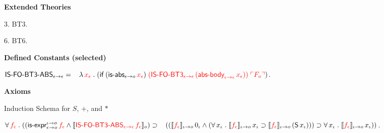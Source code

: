 \begin{biformthy}
    \ee

\ei
\end{biformthy}

\begin{biformthy}\em

\bi

  \item[]

  \item[] \textbf{Extended Theories} 

  \be

    \item[3.] BT3.

    \item[6.] BT6.

  \ee

  \item[] \textbf{Defined Constants (selected)}

  \be

    \setcounter{enumi}{7}

    \item $\mbox{\sf IS-FO-BT3-ABS}_{\epsilon \rightarrow \epsilon} = {}\\
    \hspace*{2ex}\lambda\, \textcolor{red}{x_\epsilon} \mathrel. 
    (\mbox{\sf if} \; (\mbox{\sf is-abs}_{\epsilon \rightarrow o} \, \textcolor{red}{x_\epsilon}) \;
    \textcolor{red}{(\mbox{\sf IS-FO-BT3}_{\epsilon \rightarrow \epsilon} \,
    (\mbox{\sf abs-body}_{\epsilon \rightarrow \epsilon} \, x_\epsilon))} \;
    \textcolor{red}{\ulcorner F_o\urcorner})$.

  \ee

  \item[] \textbf{Axioms}

  \be

    \setcounter{enumi}{30}

    \item Induction Schema for $S$, $+$, and $*$

    $\forall\, \textcolor{red}{f_\epsilon} \mathrel. 
    ((\mbox{\sf is-expr}_{\epsilon \rightarrow o}^{\iota \rightarrow o} \, \textcolor{red}{f_\epsilon} \wedge
    \llbracket\textcolor{red}{\mbox{\sf IS-FO-BT3-ABS}_{\epsilon \rightarrow \epsilon} \, 
    f_\epsilon}\rrbracket_o) \supset {} \\
    \hspace*{2ex}((\llbracket\textcolor{red}{f_\epsilon}\rrbracket_{\iota \rightarrow o} \, 0_\iota \wedge
    (\forall\, x_\iota \mathrel. 
    \llbracket\textcolor{red}{f_\epsilon}\rrbracket_{\iota \rightarrow o} \, x_\iota \supset
    \llbracket\textcolor{red}{f_\epsilon}\rrbracket_{\iota \rightarrow o} \, 
    (\mbox{\sf S} \, x_\iota))) \supset 
    \forall\, x_\iota \mathrel. 
    \llbracket\textcolor{red}{f_\epsilon}\rrbracket_{\iota \rightarrow o} \, x_\iota))$.


\end{biformthy}
